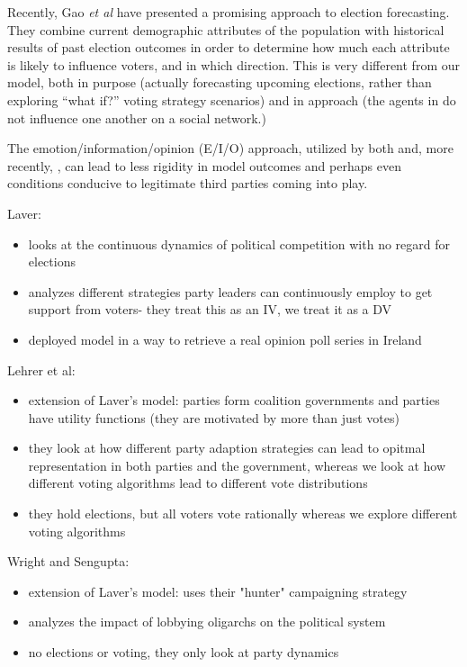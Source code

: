 Recently, Gao \textit{et al}\cite{gao_forecasting_2022} have presented a
promising approach to election forecasting. They combine current demographic
attributes of the population with historical results of past election outcomes
in order to determine how much each attribute is likely to influence voters,
and in which direction. This is very different from our model, both in purpose
(actually forecasting upcoming elections, rather than exploring ``what if?''
voting strategy scenarios) and in approach (the agents in
\cite{gao_forecasting_2022} do not influence one another on a social network.)

The emotion/information/opinion (E/I/O) approach, utilized by both
\cite{sobkowicz_quantitative_2016} and, more recently,
\cite{burke_quantitatively_2022}, can lead to less rigidity in model outcomes
and perhaps even conditions conducive to legitimate third parties coming into
play.

Laver:
\begin{itemize}
\item looks at the continuous dynamics of political competition with no regard for elections
\item analyzes different strategies party leaders can continuously employ to get support from voters- they treat this as an IV, we treat it as a DV
\item deployed model in a way to retrieve a real opinion poll series in Ireland
\end{itemize}
Lehrer et al:
\begin{itemize}
\item extension of Laver's model: parties form coalition governments and parties have utility functions (they are motivated by more than just votes)
\item they look at how different party adaption strategies can lead to opitmal representation in both parties and the government, whereas we look at how different voting algorithms lead to different vote distributions
\item they hold elections, but all voters vote rationally whereas we explore different voting algorithms
\end{itemize}
Wright and Sengupta:
\begin{itemize}
\item extension of Laver's model: uses their "hunter" campaigning  strategy
\item analyzes the impact of lobbying oligarchs on the political system
\item no elections or voting, they only look at party dynamics
\end{itemize}
